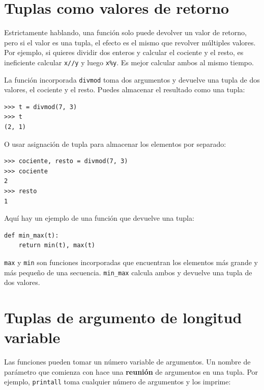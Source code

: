 \documentclass[10pt]{book}
\begin{document}
\section{Tuplas como valores de retorno}

Estrictamente hablando, una función solo puede devolver un valor de retorno, pero
si el valor es una tupla, el efecto es el mismo que revolver
múltiples valores.  Por ejemplo, si quieres dividir dos enteros
y calcular el cociente y el resto, es ineficiente
calcular {\tt x//y} y luego {\tt x\%y}.  Es mejor calcular
ambos al mismo tiempo.

La función incorporada {\tt divmod} toma dos argumentos y
devuelve una tupla de dos valores, el cociente y el resto.
Puedes almacenar el resultado como una tupla:

\begin{verbatim}
>>> t = divmod(7, 3)
>>> t
(2, 1)
\end{verbatim}
%
O usar asignación de tupla para almacenar los elementos por separado:

\begin{verbatim}
>>> cociente, resto = divmod(7, 3)
>>> cociente
2
>>> resto
1
\end{verbatim}
%
Aquí hay un ejemplo de una función que devuelve una tupla:

\begin{verbatim}
def min_max(t):
    return min(t), max(t)
\end{verbatim}
%
{\tt max} y {\tt min} son funciones incorporadas que encuentran
los elementos más grande y más pequeño de una secuencia.  \verb"min_max"
calcula ambos y devuelve una tupla de dos valores.


\section{Tuplas de argumento de longitud variable}
\label{gather}

Las funciones pueden tomar un número variable de argumentos.  Un nombre de parámetro
que comienza con {\tt *} hace una {\bf reunión} de argumentos en
una tupla.  Por ejemplo, {\tt printall}
toma cualquier número de argumentos y los imprime:
\end{document}
